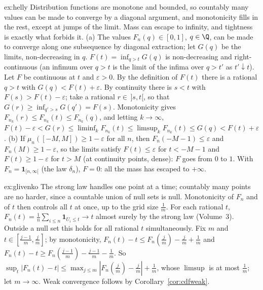 \begin{solution}{ex:helly}
\idea Distribution functions are monotone and bounded, so countably many values can be made to converge by a diagonal argument, and monotonicity fills in the rest, except at jumps of the limit. Mass can
escape to infinity, and tightness is exactly what forbids it.
\writeup (a) The values $F_n(q)\in[0,1]$, $q\in\Q$, can be made to converge along one subsequence by diagonal extraction; let $G(q)$ be the limits, non-decreasing in $q$. $F(t)=\inf_{q>t}G(q)$ is non-decreasing and right-continuous
(an infimum over $q>t$ is the limit of the infima over $q>t'$ as $t'\downarrow t$). Let $F$ be continuous at $t$ and $\varepsilon>0$. By the definition of $F(t)$ there is a rational $q>t$ with $G(q)<F(t)+\varepsilon$. By continuity there is $s<t$ with $F(s)>F(t)-\varepsilon$; take a rational $r\in\,]s,t[$, so that $G(r)\ge\inf_{q'>s}G(q')=F(s)$. Monotonicity gives $F_{n_k}(r)\le F_{n_k}(t)\le F_{n_k}(q)$, and letting $k\to\infty$, $F(t)-\varepsilon<G(r)\le\liminf_kF_{n_k}(t)\le\limsup_kF_{n_k}(t)\le G(q)<F(t)+\varepsilon$. (b) If $\mu_n([-M,M])\ge1-\varepsilon$ for all $n$, then $F_n(-M-1)\le\varepsilon$ and
$F_n(M)\ge1-\varepsilon$, so the limits satisfy $F(t)\le\varepsilon$ for $t<-M-1$ and $F(t)\ge1-\varepsilon$ for $t>M$ (at continuity points, dense): $F$ goes from $0$ to $1$. With $F_n=\mathbf 1_{[n,\infty[}$ (the law $\delta_n$), $F=0$: all the
mass has escaped to $+\infty$.
\end{solution}

\begin{solution}{ex:glivenko}
\idea The strong law handles one point at a time; countably many points are no harder, since a countable union of null sets is null. Monotonicity of $F_n$ and of $t$ then controls all $t$ at once, up to the grid
size $\frac1m$.
\writeup For each rational $t$, $F_n(t)=\frac1n\sum_{i\le n}\mathbf 1_{U_i\le t}\to t$ almost surely by the strong law (Volume~3). Outside a null set this holds for all rational $t$ simultaneously. Fix $m$ and $t\in[\frac{j-1}m,\frac jm]$; by
monotonicity, $F_n(t)-t\le F_n(\frac jm)-\frac jm+\frac1m$ and $F_n(t)-t\ge F_n(\frac{j-1}m)-\frac{j-1}m-\frac1m$. So $\sup_t|F_n(t)-t|\le\max_{j\le m}|F_n(\frac jm)-\frac jm|+\frac1m$, whose $\limsup$ is at most $\frac1m$; let $m\to\infty$. Weak
convergence follows by Corollary~\ref{cor:cdfweak}.
\end{solution}

